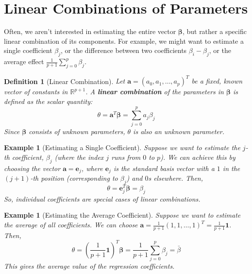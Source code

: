 \documentclass[11pt]{article}
\theoremstyle{mytheoremstyle}
\theoremstyle{mydefinitionstyle}
\newtheorem{definition}[theorem]{Definition}
\newtheorem{example}[theorem]{Example}
\newcommand{\vect}[1]{\mathbf{#1}}
\begin{document}
\section{Linear Combinations of Parameters}

Often, we aren't interested in estimating the entire vector $\vect{\beta}$, but rather a specific linear combination of its components. For example, we might want to estimate a single coefficient $\beta_j$, or the difference between two coefficients $\beta_i - \beta_j$, or the average effect $\frac{1}{p+1}\sum_{j=0}^p \beta_j$.

\begin{definition}[Linear Combination]
Let $\vect{a} = (a_0, a_1, \dots, a_p)^T$ be a fixed, known vector of constants in $\mathbb{R}^{p+1}$. A \textbf{linear combination} of the parameters in $\vect{\beta}$ is defined as the scalar quantity:
\begin{equation*}
\theta = \vect{a}^T \vect{\beta} = \sum_{j=0}^{p} a_j \beta_j
\end{equation*}
Since $\vect{\beta}$ consists of unknown parameters, $\theta$ is also an unknown parameter.
\end{definition}

\begin{example}[Estimating a Single Coefficient]
Suppose we want to estimate the $j$-th coefficient, $\beta_j$ (where the index $j$ runs from $0$ to $p$). We can achieve this by choosing the vector $\vect{a} = \vect{e}_j$, where $\vect{e}_j$ is the standard basis vector with a $1$ in the $(j+1)$-th position (corresponding to $\beta_j$) and $0$s elsewhere. Then,
\begin{equation*}
\theta = \vect{e}_j^T \vect{\beta} = \beta_j
\end{equation*}
So, individual coefficients are special cases of linear combinations.
\end{example}

\begin{example}[Estimating the Average Coefficient]
Suppose we want to estimate the average of all coefficients. We can choose $\vect{a} = \frac{1}{p+1} (1, 1, \dots, 1)^T = \frac{1}{p+1} \mathbf{1}$. Then,
\begin{equation*}
\theta = \left(\frac{1}{p+1} \mathbf{1}\right)^T \vect{\beta} = \frac{1}{p+1} \sum_{j=0}^{p} \beta_j = \bar{\beta}
\end{equation*}
This gives the average value of the regression coefficients.
\end{example}
\end{document}
